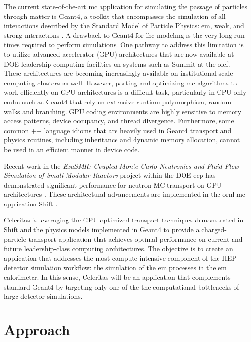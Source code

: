 \documentclass[10pt]{article}
\begin{document}
The current state-of-the-art \ac{mc} application for simulating the passage of
particles through matter is Geant4, a toolkit that encompasses the simulation of
all interactions described by the Standard Model of Particle Physics: \ac{em},
weak, and strong interactions \cite{geant4}. A drawback to Geant4 for \ac{lhc}
modeling is the very long run times required to perform simulations. One pathway
to address this limitation is to utilize advanced accelerator (GPU)
architectures that are now available at DOE leadership computing facilities on
systems such as Summit at the \ac{olcf}. These architectures are becoming
increasingly available on institutional-scale computing clusters as well.
However, porting and optimizing \ac{mc} algorithms to work efficiently on GPU
architectures is a difficult task, particularly in CPU-only codes such as Geant4
that rely on extensive runtime polymorphism, random walks and branching. GPU
coding environments are highly sensitive to memory access patterns, device
occupancy, and thread divergence. Furthermore, some common \C++ language idioms
that are heavily used in Geant4 transport and physics routines, including
inheritance and dynamic memory allocation, cannot be used in an efficient manner
in device code.

Recent work in the \emph{ExaSMR: Coupled Monte Carlo Neutronics and Fluid Flow
Simulation of Small Modular Reactors} project within the DOE \ac{ecp}
\cite{ecp2019} has demonstrated significant performance for neutron MC transport
on GPU architectures \cite{hamilton_continuous-energy_2019}. These architectural
advancements are implemented in the \ac{ornl} \ac{mc} application Shift
\cite{pandya_implementation_2016}.

Celeritas is leveraging the GPU-optimized transport techniques demonstrated in
Shift and the physics models implemented in Geant4 to provide a charged-particle
transport application that achieves optimal performance on current and future
leadership-class computing architectures. The objective is to create an
application that addresses the most compute-intensive component of the HEP
detector simulation workflow: the simulation of the \ac{em} processes in the
\ac{em} calorimeter. In this sense, Celeritas will be an application that
complements standard Geant4 by targeting only one of the the computational
bottlenecks of large detector simulations.

\section*{Approach}
\end{document}
